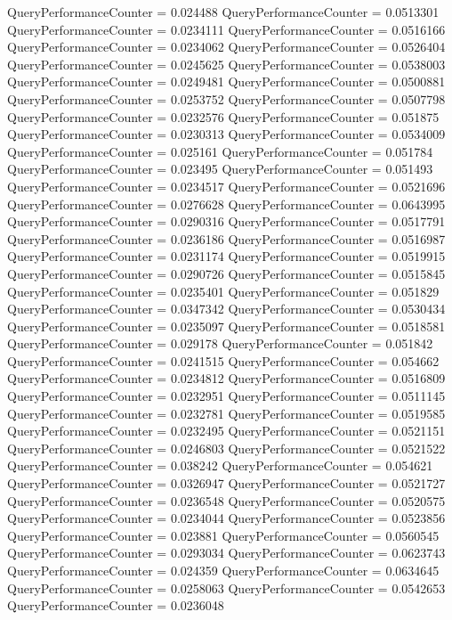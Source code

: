 \documentclass[9pt]{article}
\theoremstyle{plain}
\theoremstyle{definition}
\theoremstyle{remark}
\numberwithin{equation}{section}
\begin{document}
QueryPerformanceCounter  =  0.024488
QueryPerformanceCounter  =  0.0513301
QueryPerformanceCounter  =  0.0234111
QueryPerformanceCounter  =  0.0516166
QueryPerformanceCounter  =  0.0234062
QueryPerformanceCounter  =  0.0526404
QueryPerformanceCounter  =  0.0245625
QueryPerformanceCounter  =  0.0538003
QueryPerformanceCounter  =  0.0249481
QueryPerformanceCounter  =  0.0500881
QueryPerformanceCounter  =  0.0253752
QueryPerformanceCounter  =  0.0507798
QueryPerformanceCounter  =  0.0232576
QueryPerformanceCounter  =  0.051875
QueryPerformanceCounter  =  0.0230313
QueryPerformanceCounter  =  0.0534009
QueryPerformanceCounter  =  0.025161
QueryPerformanceCounter  =  0.051784
QueryPerformanceCounter  =  0.023495
QueryPerformanceCounter  =  0.051493
QueryPerformanceCounter  =  0.0234517
QueryPerformanceCounter  =  0.0521696
QueryPerformanceCounter  =  0.0276628
QueryPerformanceCounter  =  0.0643995
QueryPerformanceCounter  =  0.0290316
QueryPerformanceCounter  =  0.0517791
QueryPerformanceCounter  =  0.0236186
QueryPerformanceCounter  =  0.0516987
QueryPerformanceCounter  =  0.0231174
QueryPerformanceCounter  =  0.0519915
QueryPerformanceCounter  =  0.0290726
QueryPerformanceCounter  =  0.0515845
QueryPerformanceCounter  =  0.0235401
QueryPerformanceCounter  =  0.051829
QueryPerformanceCounter  =  0.0347342
QueryPerformanceCounter  =  0.0530434
QueryPerformanceCounter  =  0.0235097
QueryPerformanceCounter  =  0.0518581
QueryPerformanceCounter  =  0.029178
QueryPerformanceCounter  =  0.051842
QueryPerformanceCounter  =  0.0241515
QueryPerformanceCounter  =  0.054662
QueryPerformanceCounter  =  0.0234812
QueryPerformanceCounter  =  0.0516809
QueryPerformanceCounter  =  0.0232951
QueryPerformanceCounter  =  0.0511145
QueryPerformanceCounter  =  0.0232781
QueryPerformanceCounter  =  0.0519585
QueryPerformanceCounter  =  0.0232495
QueryPerformanceCounter  =  0.0521151
QueryPerformanceCounter  =  0.0246803
QueryPerformanceCounter  =  0.0521522
QueryPerformanceCounter  =  0.038242
QueryPerformanceCounter  =  0.054621
QueryPerformanceCounter  =  0.0326947
QueryPerformanceCounter  =  0.0521727
QueryPerformanceCounter  =  0.0236548
QueryPerformanceCounter  =  0.0520575
QueryPerformanceCounter  =  0.0234044
QueryPerformanceCounter  =  0.0523856
QueryPerformanceCounter  =  0.023881
QueryPerformanceCounter  =  0.0560545
QueryPerformanceCounter  =  0.0293034
QueryPerformanceCounter  =  0.0623743
QueryPerformanceCounter  =  0.024359
QueryPerformanceCounter  =  0.0634645
QueryPerformanceCounter  =  0.0258063
QueryPerformanceCounter  =  0.0542653
QueryPerformanceCounter  =  0.0236048
\end{document}
